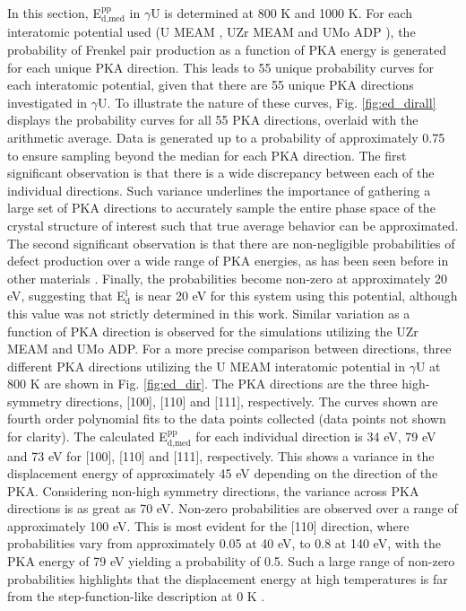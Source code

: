 \documentclass[review]{elsarticle}
\begin{document}
In this section, E$^{\textrm{pp}}_{\textrm{d,med}}$ in $\gamma$U is determined at 800 K and 1000 K. For each interatomic potential used (U MEAM \cite{beeler_meam}, UZr MEAM \cite{moore2015} and UMo ADP \cite{smirnovaADP}), the probability of Frenkel pair production as a function of PKA energy is generated for each unique PKA direction. This leads to 55 unique probability curves for each interatomic potential, given that there are 55 unique PKA directions investigated in $\gamma$U. To illustrate the nature of these curves, Fig. \ref{fig:ed_dirall} displays the probability curves for all 55 PKA directions, overlaid with the arithmetic average. Data is generated up to a probability of approximately 0.75 to ensure sampling beyond the median for each PKA direction. The first significant observation is that there is a wide discrepancy between each of the individual directions. Such variance underlines the importance of gathering a large set of PKA directions to accurately sample the entire phase space of the crystal structure of interest such that true average behavior can be approximated. The second significant observation is that there are non-negligible probabilities of defect production over a wide range of PKA energies, as has been seen before in other materials \cite{beeler2016, nordlund2006, zepeda-ruiz2003, tsuchihira2013}. Finally, the probabilities become non-zero at approximately 20 eV, suggesting that E$^{\textrm{l}}_{\textrm{d}}$ is near 20 eV for this system using this potential, although this value was not strictly determined in this work. Similar variation as a function of PKA direction is observed for the simulations utilizing the UZr MEAM and UMo ADP. For a more precise comparison between directions, three different PKA directions utilizing the U MEAM interatomic potential in $\gamma$U at 800 K are shown in Fig. \ref{fig:ed_dir}. The PKA directions are the three high-symmetry directions, [100], [110] and [111], respectively. The curves shown are fourth order polynomial fits to the data points collected (data points not shown for clarity). The calculated E$^{\textrm{pp}}_{\textrm{d,med}}$ for each individual direction is 34 eV, 79 eV and 73 eV for [100], [110] and [111], respectively. This shows a variance in the displacement energy of approximately 45 eV depending on the direction of the PKA. Considering non-high symmetry directions, the variance across PKA directions is as great as 70 eV. Non-zero probabilities are observed over a range of approximately 100 eV. This is most evident for the [110] direction, where probabilities vary from approximately 0.05 at 40 eV, to 0.8 at 140 eV, with the PKA energy of 79 eV yielding a probability of 0.5. Such a large range of non-zero probabilities highlights that the displacement energy at high temperatures is far from the step-function-like description at 0 K \cite{was2007}.
 
\end{document}
